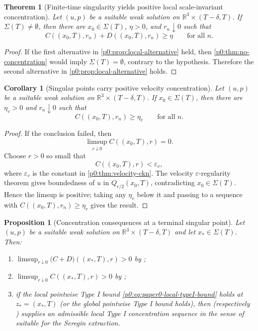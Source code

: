 \documentclass[11pt]{amsart}
\theoremstyle{plain}
\newtheorem{theorem}{Theorem}[section]
\newtheorem{proposition}[proposition]{Proposition}
\newtheorem{corollary}[corollary]{Corollary}
\theoremstyle{definition}
\theoremstyle{remark}
\numberwithin{equation}{section}
\begin{document}
\begin{theorem}[Finite-time singularity yields positive local scale-invariant concentration]
\label{p0:thm:singular-positive}
Let \((u,p)\) be a suitable weak solution on
\(\mathbb R^3\times(T-\delta,T)\).  If \(\Sigma(T)\ne\emptyset\), then there
are \(x_0\in\Sigma(T)\), \(\eta>0\), and \(r_n\downarrow0\) such that
\[
  C((x_0,T),r_n)+D((x_0,T),r_n)\ge\eta
  \qquad\text{for all }n.
\]
\end{theorem}

\begin{proof}
If the first alternative in \cref{p0:prop:local-alternative} held, then
\cref{p0:thm:no-concentration} would imply \(\Sigma(T)=\emptyset\), contrary to
the hypothesis.  Therefore the second alternative in
\cref{p0:prop:local-alternative} holds.
\end{proof}

\begin{corollary}[Singular points carry positive velocity concentration]
\label{p0:cor:velocity-concentration}
Let \((u,p)\) be a suitable weak solution on
\(\mathbb R^3\times(T-\delta,T)\).  If \(x_0\in\Sigma(T)\), then there are
\(\eta_v>0\) and \(r_n\downarrow0\) such that
\[
  C((x_0,T),r_n)\ge\eta_v
  \qquad\text{for all }n.
\]
\end{corollary}

\begin{proof}
If the conclusion failed, then
\[
  \limsup_{r\downarrow0} C((x_0,T),r)=0.
\]
Choose \(r>0\) so small that
\[
  C((x_0,T),r)<\varepsilon_v,
\]
where \(\varepsilon_v\) is the constant in
\cref{p0:thm:velocity-ckn}.  The velocity \(\varepsilon\)-regularity theorem gives
boundedness of \(u\) in \(Q_{r/2}(x_0,T)\), contradicting
\(x_0\in\Sigma(T)\).  Hence the limsup is positive; taking any
\(\eta_v\) below it and passing to a sequence with
\(C((x_0,T),r_n)\ge\eta_v\) gives the result.
\end{proof}

\begin{proposition}[Concentration consequences at a terminal singular point]
\label{p0:prop:concentration-package}
Let \((u,p)\) be a suitable weak solution on \(\mathbb R^3\times(T-\delta,T)\)
and let \(x_*\in\Sigma(T)\).  Then:
\begin{enumerate}[label=\textup{(\arabic*)}]
\item \(\limsup_{r\downarrow0}\bigl(C+D\bigr)((x_*,T),r)>0\) by
;
\item \(\limsup_{r\downarrow0}C((x_*,T),r)>0\) by
;
\item if the local pointwise Type I bound
\eqref{p0:eq:paper0-local-typeI-bound} holds at \(z_*=(x_*,T)\) (or
the global pointwise Type I bound holds), then
 (respectively
) supplies an admissible local Type I
concentration sequence in the sense of
 suitable for the
Seregin extraction.
\end{enumerate}
\end{proposition}
\end{document}

